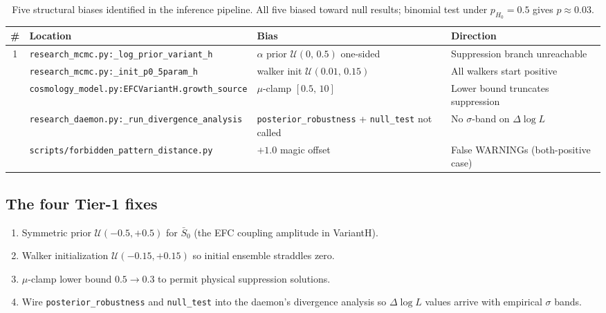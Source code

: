 \documentclass[11pt]{article}
\begin{document}
\begin{table}[h]
\centering
\footnotesize
\setlength{\tabcolsep}{6pt}
\begin{tabularx}{\linewidth}{@{}c L{4.6cm} Y L{3.6cm}@{}}
\toprule
{}
\textbf{\#} & \textbf{Location} & \textbf{Bias} & \textbf{Direction} \\
 & \texttt{research\_mcmc.py:}\newline\texttt{\_log\_prior\_variant\_h} &
$\alpha$ prior $\mathcal{U}(0,\,0.5)$ one-sided &
Suppression branch unreachable \\
 & \texttt{research\_mcmc.py:}\newline\texttt{\_init\_p0\_5param\_h} &
walker init $\mathcal{U}(0.01,\,0.15)$ &
All walkers start positive \\
 & \texttt{cosmology\_model.py:}\newline\texttt{EFCVariantH.}\linebreak\texttt{growth\_source} &
$\mu$-clamp $[0.5,\,10]$ &
Lower bound truncates suppression \\
 & \texttt{research\_daemon.py:}\newline\texttt{\_run\_divergence\_}\linebreak\texttt{analysis} &
\texttt{posterior\_robustness} + \texttt{null\_test} not called &
No $\sigma$-band on $\Delta\log L$ \\
 & \texttt{scripts/}\newline\texttt{forbidden\_pattern\_}\linebreak\texttt{distance.py} &
$+1.0$ magic offset &
False WARNINGs (both-positive case) \\
\bottomrule
\end{tabularx}
\caption{Five structural biases identified in the inference pipeline. All
five biased toward null results; binomial test under $p_{H_0}=0.5$
gives $p\approx0.03$.}
\label{tab:biases}
\end{table}

\subsection{The four Tier-1 fixes}

\begin{enumerate}[leftmargin=*]
\item Symmetric prior $\mathcal{U}(-0.5, +0.5)$ for $\bar{S}_0$ (the EFC
  coupling amplitude in VariantH).
\item Walker initialization $\mathcal{U}(-0.15, +0.15)$ so initial
  ensemble straddles zero.
\item $\mu$-clamp lower bound $0.5 \to 0.3$ to permit physical
  suppression solutions.
\item Wire \texttt{posterior\_robustness} and \texttt{null\_test} into
  the daemon's divergence analysis so $\Delta\log L$ values arrive with
  empirical $\sigma$ bands.
\end{enumerate}
\end{document}
